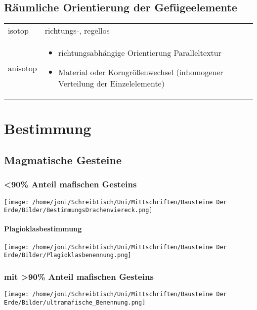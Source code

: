 \documentclass[a4, 12pt]{scrreprt}
\begin{document}
\section{Räumliche Orientierung der Gefügeelemente}

\begin{center}
\begin{tabular}{@{}lp{9cm}@{}}
isotop & richtungs-, regellos\\
anisotop & \begin{itemize}
\item richtungsabhängige Orientierung Paralleltextur
\item Material oder Korngrößenwechsel (inhomogener Verteilung der Einzelelemente)
\end{itemize}\\
\end{tabular}
\end{center}

\chapter{Bestimmung}

\section{Magmatische Gesteine}

\subsection{<90\% Anteil mafischen Gesteins}

\texttt{[image: /home/joni/Schreibtisch/Uni/Mittschriften/Bausteine Der Erde/Bilder/BestimmungsDrachenviereck.png]}

\subsubsection{Plagioklasbestimmung}

\texttt{[image: /home/joni/Schreibtisch/Uni/Mittschriften/Bausteine Der Erde/Bilder/Plagioklasbenennung.png]}

\subsection{mit >90\% Anteil mafischen Gesteins}

\texttt{[image: /home/joni/Schreibtisch/Uni/Mittschriften/Bausteine Der Erde/Bilder/ultramafische\_Benennung.png]}
\end{document}
